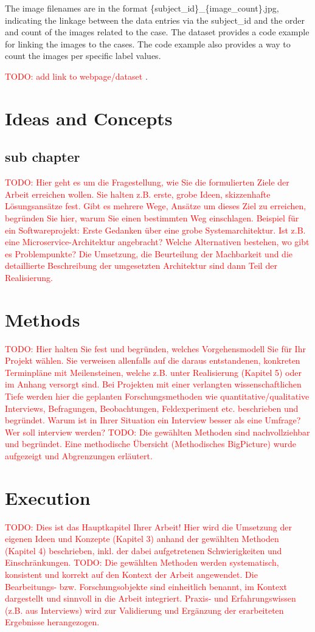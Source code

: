 \documentclass[a4paper,12pt,listof=numbered,toc=chapterentrywithdots]{scrreport}
\renewcommand{\todo}[1]{\textcolor{red}{TODO: #1}}
\begin{document}
			The image filenames are in the format \{subject\_id\}\_\{image\_count\}.jpg, indicating the linkage between the data entries via the subject\_id and the order and count of the images related to the case. The dataset provides a code example for linking the images to the cases. The code example also provides a way to count the images per specific label values.
			
			\todo{add link to webpage/dataset}
			.
	
	\chapter{Ideas and Concepts}
	\section{sub chapter}
		\todo{Hier geht es um die Fragestellung, wie Sie die formulierten Ziele der Arbeit erreichen wollen. Sie halten z.B. erste, grobe Ideen, skizzenhafte Lösungsansätze fest. Gibt es mehrere Wege, Ansätze um dieses Ziel zu erreichen, begründen Sie hier, warum Sie einen bestimmten Weg einschlagen. Beispiel für ein Softwareprojekt: Erste Gedanken über eine grobe Systemarchitektur. Ist z.B. eine Microservice-Architektur angebracht? Welche Alternativen bestehen, wo gibt es Problempunkte? Die Umsetzung, die Beurteilung der Machbarkeit und die detaillierte Beschreibung der umgesetzten Architektur sind dann Teil der Realisierung.}
	
	\chapter{Methods}
		\todo{Hier halten Sie fest und begründen, welches Vorgehensmodell Sie für Ihr Projekt wählen. Sie verweisen allenfalls auf die daraus entstandenen, konkreten Terminpläne mit Meilensteinen, welche z.B. unter Realisierung (Kapitel 5) oder im Anhang versorgt sind. Bei Projekten mit einer verlangten wissenschaftlichen Tiefe werden hier die geplanten Forschungsmethoden wie quantitative/qualitative Interviews, Befragungen, Beobachtungen, Feldexperiment etc. beschrieben und begründet. Warum ist in Ihrer Situation ein Interview besser als eine Umfrage? Wer soll interview werden?}
		\todo{Die gewählten Methoden sind nachvollziehbar und begründet. Eine methodische Übersicht (Methodisches BigPicture) wurde aufgezeigt und Abgrenzungen erläutert.}
	
	\chapter{Execution}
		\todo{Dies ist das Hauptkapitel Ihrer Arbeit! Hier wird die Umsetzung der eigenen Ideen und Konzepte (Kapitel 3) anhand der gewählten Methoden (Kapitel 4) beschrieben, inkl. der dabei aufgetretenen Schwierigkeiten und Einschränkungen.}
		\todo{Die gewählten Methoden werden systematisch, konsistent und korrekt auf den Kontext der Arbeit angewendet. Die Bearbeitungs- bzw. Forschungsobjekte sind einheitlich benannt, im Kontext dargestellt und sinnvoll in die Arbeit integriert. Praxis- und Erfahrungswissen (z.B. aus Interviews) wird zur Validierung und Ergänzung der erarbeiteten Ergebnisse herangezogen. }
	
\end{document}
